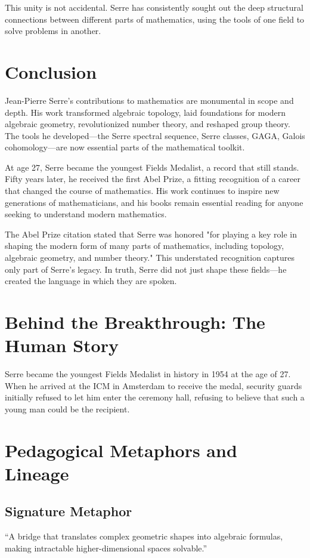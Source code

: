 This unity is not accidental. Serre has consistently sought out the deep structural connections between different parts of mathematics, using the tools of one field to solve problems in another.

\section{Conclusion}

Jean-Pierre Serre's contributions to mathematics are monumental in scope and depth. His work transformed algebraic topology, laid foundations for modern algebraic geometry, revolutionized number theory, and reshaped group theory. The tools he developed---the Serre spectral sequence, Serre classes, GAGA, Galois cohomology---are now essential parts of the mathematical toolkit.

At age 27, Serre became the youngest Fields Medalist, a record that still stands. Fifty years later, he received the first Abel Prize, a fitting recognition of a career that changed the course of mathematics. His work continues to inspire new generations of mathematicians, and his books remain essential reading for anyone seeking to understand modern mathematics.

The Abel Prize citation stated that Serre was honored "for playing a key role in shaping the modern form of many parts of mathematics, including topology, algebraic geometry, and number theory." This understated recognition captures only part of Serre's legacy. In truth, Serre did not just shape these fields---he created the language in which they are spoken.


\section{Behind the Breakthrough: The Human Story}
Serre became the youngest Fields Medalist in history in 1954 at the age of 27. When he arrived at the ICM in Amsterdam to receive the medal, security guards initially refused to let him enter the ceremony hall, refusing to believe that such a young man could be the recipient.

\section{Pedagogical Metaphors and Lineage}
\subsection{Signature Metaphor}
``A bridge that translates complex geometric shapes into algebraic formulas, making intractable higher-dimensional spaces solvable.''


